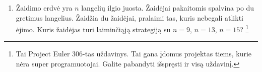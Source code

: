 \begin{enumerate}
  \item Žaidimo erdvė yra $n$ langelių ilgio juosta. Žaidėjai pakaitomis spalvina
    po du gretimus langelius. Žaidžia du žaidėjai, pralaimi tas, kuris nebegali
    atlikti ėjimo. Kuris žaidėjas turi laiminčiąją strategiją su $n=9$, $n=13$,
    $n=15$? \footnote{Tai Project Euler 306-tas uždavinys. Tai gana įdomus projektas
    tiems, kurie nėra super programuotojai. Galite pabandyti išspręsti ir visą
    uždavinį.}


\end{enumerate}
